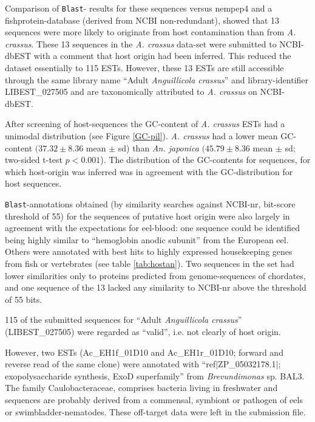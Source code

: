 Comparison of \texttt{Blast}- results for these sequences versus
nempep4 and a fishprotein-database (derived from NCBI non-redundant),
showed that 13 sequences were more likely to originate from host
contamination than from \textit{A. crassus}. These 13 sequences in the
\textit{A. crassus} data-set were submitted to NCBI-dbEST with a
comment that host origin had been inferred. This reduced the dataset
essentially to 115 ESTs. However, these 13 ESTs are still accessible
through the same library name ``Adult \textit{Anguillicola crassus}''
and library-identifier LIBEST\_027505 and are taxonomically attributed
to \textit{A. crassus} on NCBI-dbEST.


After screening of host-sequences the GC-content of
\textit{A. crassus} ESTs had a unimodal distribution (see Figure
\ref{GC-pil}). \textit{A. crassus} had a lower mean GC-content $(37.32
\pm 8.36$ mean $\pm$ sd) than \textit{An. japonica} $(45.79 \pm
8.36$ mean $\pm$ sd; two-sided t-test $p<0.001$). The distribution of
the GC-contents for sequences, for which host-origin was inferred was
in agreement with the GC-distribution for host sequences.

\texttt{Blast}-annotations obtained (by similarity searches against
NCBI-nr, bit-score threshold of 55) for the sequences of putative host
origin were also largely in agreement with the expectations for
eel-blood: one sequence could be identified being highly similar to
``hemoglobin anodic subunit'' from the European eel. Others were
annotated with best hits to highly expressed housekeeping genes from
fish or vertebrates (see table \ref{tab:hostan}). Two sequences in the
set had lower similarities only to proteins predicted from
genome-sequences of chordates, and one sequence of the 13 lacked any
similarity to NCBI-nr above the threshold of 55 bits.

115 of the submitted sequences for ``Adult \textit{Anguillicola
  crassus}'' (LIBEST\_027505) were regarded as ``valid'', i.e. not
clearly of host origin.

However, two ESTs (Ac\_EH1f\_01D10 and Ac\_EH1r\_01D10; forward and
reverse read of the same clone) were annotated with
``ref$|$ZP\_05032178.1$|$; exopolysaccharide synthesis, ExoD
superfamily'' from \textit{Brevundimonas} sp. BAL3. The family
Caulobacteraceae, comprises bacteria living in freshwater and
sequences are probably derived from a commensal, symbiont or pathogen
of eels or swimbladder-nematodes. These off-target data were left in
the submission file.

